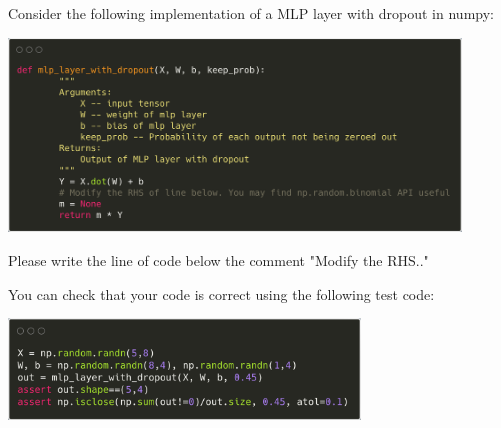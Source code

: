 \begin{frame}
\section{}
Consider the following implementation of a MLP layer with dropout in numpy:

\includegraphics[width=0.9\textwidth]{images/quiz_4_4_3_4a.png}

Please write the line of code below the comment "Modify the RHS.."

You can check that your code is correct using the following test code:

\includegraphics[width=0.7\textwidth]{images/quiz_4_4_3_4b.png}



\end{frame}
